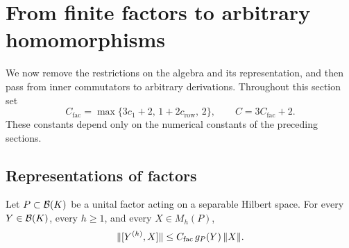\section{From finite factors to arbitrary homomorphisms}\label{sec:global}

We now remove the restrictions on the algebra and its representation, and
then pass from inner commutators to arbitrary derivations.  Throughout this
section set
\begin{equation}\label{eq:global-constants}
 C_{\mathrm{fac}}
   =\max\{3c_1+2,\,1+2c_{\mathrm{row}},\,2\},
 \qquad C=3C_{\mathrm{fac}}+2.
\end{equation}
These constants depend only on the numerical constants of the preceding
sections.

\subsection{Representations of factors}

\begin{proposition}\label{prop:factor-representations}
Let $P\subset\mathcal B(K)$ be a unital factor acting on a separable Hilbert space.
For every $Y\in\mathcal B(K)$, every $h\ge1$, and every $X\in M_h(P)$,
\[
 \lVert[Y^{(h)},X]\rVert
   \le C_{\mathrm{fac}}\,g_P(Y)\,\lVert X\rVert.
\]
\end{proposition}

